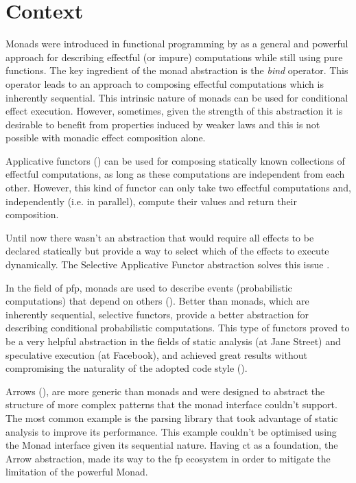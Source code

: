 \documentclass[
  oneside,
  11pt, a4paper,
  footinclude=true,
  headinclude=true,
  cleardoublepage=empty
]{scrbook}
\theoremstyle{definition}
\theoremstyle{definition}
\begin{document}
    \section{Context}\label{sec-context}
    
    Monads were introduced in functional programming by \cite{1995_wadler_monads} as a general and powerful approach for describing effectful (or impure) computations while still using pure functions. The key ingredient of the monad abstraction is the \textit{bind} operator. This operator leads to an approach to composing effectful computations which is inherently sequential. This intrinsic nature of monads can be used for conditional effect execution. However, sometimes, given the strength of this abstraction it is desirable to benefit from properties induced by weaker laws and this is not possible with monadic effect composition alone.

    Applicative functors (\cite{mcbride2008applicative}) can be used for composing statically known collections of effectful computations, as long as these computations are independent from each other. However, this kind of functor can only take two effectful computations and, independently (i.e. in parallel), compute their values and return their composition.

    Until now there wasn't an abstraction that would require all effects to be declared statically but provide a way to select which of the effects to execute dynamically. The Selective Applicative Functor abstraction solves this issue \cite{andrey2019selective}.

    In the field of \gls{pfp}, monads are used to describe events (probabilistic computations) that depend on others (\cite{erwig_kollmansberger_2006}). Better than monads, which are inherently sequential, selective functors, provide a better abstraction for describing conditional probabilistic computations. This type of functors proved to be a very helpful abstraction in the fields of static analysis (at Jane Street) and speculative execution (at Facebook), and achieved great results without compromising the naturality of the adopted code style (\cite{andrey2019selective}).
    
    Arrows (\cite{Hughes:2000:GMA:347238.347246}), are more generic than monads and were designed to abstract the structure of more complex patterns that the monad interface couldn't support. The most common example is the \cite{swiestra&duponcheel} parsing library that took advantage of static analysis to improve its performance. This example couldn't be optimised using the Monad interface given its sequential nature. Having \gls{ct} as a foundation, the Arrow abstraction, made its way to the \gls{fp} ecosystem in order to mitigate the limitation of the powerful Monad.
    
\end{document}
